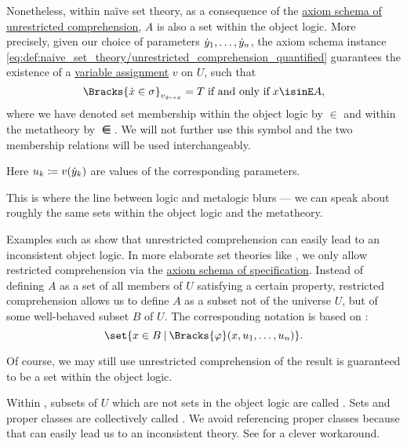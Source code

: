 \begin{definition}
  Nonetheless, within na\"ive set theory, as a consequence of the \hyperref[def:naive_set_theory/unrestricted_comprehension]{axiom schema of unrestricted comprehension}, \( A \) is also a set within the object logic. More precisely, given our choice of parameters \( {\dot{y}}_1, \ldots, {\dot{y}}_n \), the axiom schema instance \eqref{eq:def:naive_set_theory/unrestricted_comprehension_quantified} guarantees the existence of a \hyperref[def:first_order_valuation/variable_assignment]{variable assignment} \( v \) on \( U \), such that
  \begin{equation*}
    \Bracks{ \synx \in \sigma }_{ v_{\synx \mapsto x} } = T
    \T{if and only if}
    x \isinE A,
  \end{equation*}
  where we have denoted set membership within the object logic by \( \in \) and within the metatheory by \( \isinE \). We will not further use this symbol and the two membership relations will be used interchangeably.

  Here \( u_k \coloneqq v({\dot{y}}_k) \) are values of the corresponding parameters.

  This is where the line between logic and metalogic blurs --- we can speak about roughly the same sets within the object logic and the metatheory.

  Examples such as  show that unrestricted comprehension can easily lead to an inconsistent object logic. In more elaborate set theories like \hyperref[def:zfc]{}, we only allow restricted comprehension via the \hyperref[def:zfc/specification]{axiom schema of specification}. Instead of defining \( A \) as a set of all members of \( U \) satisfying a certain property, restricted comprehension allows us to define \( A \) as a subset not of the universe \( U \), but of some well-behaved subset \( B \) of \( U \). The corresponding notation is based on :
  \begin{equation*}
    \set{ x \in B \given \Bracks{\varphi}(x, u_1, \ldots, u_n) }.
  \end{equation*}

  Of course, we may still use unrestricted comprehension of the result is guaranteed to be a set within the object logic.

  Within , subsets of \( U \) which are not sets in the object logic are called . Sets and proper classes are collectively called . We avoid referencing proper classes because that can easily lead us to an inconsistent theory. See  for a clever workaround.


\end{definition}
